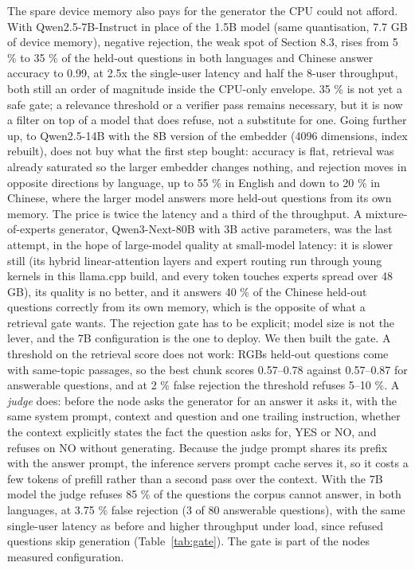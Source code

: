 \documentclass[letterpaper,twocolumn,10pt]{article}
\begin{document}
The spare device memory also pays for the generator the CPU could not afford. With Qwen2.5-7B-Instruct in place of the 1.5B model (same quantisation, 7.7 GB of device memory), negative rejection, the weak spot of Section 8.3, rises from 5 \% to 35 \% of the held-out questions in both languages and Chinese answer accuracy to 0.99, at 2.5x the single-user latency and half the 8-user throughput, both still an order of magnitude inside the CPU-only envelope. 35 \% is not yet a safe gate; a relevance threshold or a verifier pass remains necessary, but it is now a filter on top of a model that does refuse, not a substitute for one. Going further up, to Qwen2.5-14B with the 8B version of the embedder (4096 dimensions, index rebuilt), does not buy what the first step bought: accuracy is flat, retrieval was already saturated so the larger embedder changes nothing, and rejection moves in opposite directions by language, up to 55 \% in English and down to 20 \% in Chinese, where the larger model answers more held-out questions from its own memory. The price is twice the latency and a third of the throughput. A mixture-of-experts generator, Qwen3-Next-80B with 3B active parameters, was the last attempt, in the hope of large-model quality at small-model latency: it is slower still (its hybrid linear-attention layers and expert routing run through young kernels in this llama.cpp build, and every token touches experts spread over 48 GB), its quality is no better, and it answers 40 \% of the Chinese held-out questions correctly from its own memory, which is the opposite of what a retrieval gate wants. The rejection gate has to be explicit; model size is not the lever, and the 7B configuration is the one to deploy. We then built the gate. A threshold on the retrieval score does not work: RGB\textquotesingle s held-out questions come with same-topic passages, so the best chunk scores 0.57--0.78 against 0.57--0.87 for answerable questions, and at 2 \% false rejection the threshold refuses 5--10 \%. A \emph{judge} does: before the node asks the generator for an answer it asks it, with the same system prompt, context and question and one trailing instruction, whether the context explicitly states the fact the question asks for, YES or NO, and refuses on NO without generating. Because the judge prompt shares its prefix with the answer prompt, the inference server\textquotesingle s prompt cache serves it, so it costs a few tokens of prefill rather than a second pass over the context. With the 7B model the judge refuses 85 \% of the questions the corpus cannot answer, in both languages, at 3.75 \% false rejection (3 of 80 answerable questions), with the same single-user latency as before and higher throughput under load, since refused questions skip generation (Table~\ref{tab:gate}). The gate is part of the node\textquotesingle s measured configuration.
\end{document}
